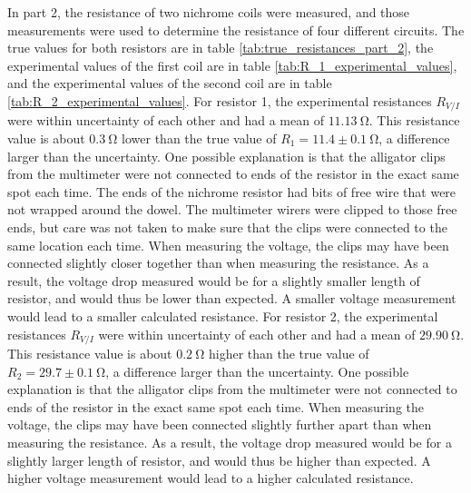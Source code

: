 \documentclass[12pt]{iopart} %
\gdef\units#1{~\mathrm{#1}}
\begin{document}
In part 2, the resistance of two nichrome coils were measured, and those measurements were used to determine the resistance of four different circuits.
The true values for both resistors are in table \ref{tab:true_resistances_part_2}, the experimental values of the first coil are in table \ref{tab:R_1_experimental_values}, and the experimental values of the second coil are in table \ref{tab:R_2_experimental_values}.
For resistor 1, the experimental resistances $R_{V/I}$ were within uncertainty of each other and had a mean of $11.13 \units{\Omega}$.
This resistance value is about $0.3 \units{\Omega}$ lower than the true value of $R_1 = 11.4 \pm 0.1 \units{\Omega}$, a difference larger than the uncertainty.
One possible explanation is that the alligator clips from the multimeter were not connected to ends of the resistor in the exact same spot each time.
The ends of the nichrome resistor had bits of free wire that were not wrapped around the dowel.
The multimeter wirers were clipped to those free ends, but care was not taken to make sure that the clips were connected to the same location each time.
When measuring the voltage, the clips may have been connected slightly closer together than when measuring the resistance.
As a result, the voltage drop measured would be for a slightly smaller length of resistor, and would thus be lower than expected.
A smaller voltage measurement would lead to a smaller calculated resistance.
For resistor 2, the experimental resistances $R_{V/I}$ were within uncertainty of each other and had a mean of $29.90 \units{\Omega}$.
This resistance value is about $0.2 \units{\Omega}$ higher than the true value of $R_2 = 29.7 \pm 0.1 \units{\Omega}$, a difference larger than the uncertainty.
One possible explanation is that the alligator clips from the multimeter were not connected to ends of the resistor in the exact same spot each time.
When measuring the voltage, the clips may have been connected slightly further apart than when measuring the resistance.
As a result, the voltage drop measured would be for a slightly larger length of resistor, and would thus be higher than expected.
A higher voltage measurement would lead to a higher calculated resistance.
\end{document}
